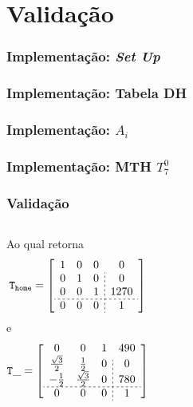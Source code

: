 \documentclass[aspectratio=169]{beamer}
\begin{document}



\section{Validação}

\begin{frame}
\frametitle{Implementação: \textit{Set Up}}

\end{frame}
\begin{frame}
\frametitle{Implementação: Tabela DH}

\end{frame}
\begin{frame}
\frametitle{Implementação: $A_i$}

\end{frame}
\begin{frame}
\frametitle{Implementação: MTH $T_7^0$}

\end{frame}
\begin{frame}
\frametitle{Validação}
\begin{columns}

Ao qual retorna
\begin{align*}
    \mathtt{T}_\mathtt{home}
    &=
    \left[
    \begin{array}{ccc;{2pt/2pt}c}
        1 & 0 & 0 & 0 \\
        0 & 1 & 0 & 0 \\
        0 & 0 & 1 & 1270 \\
        \hdashline[2pt/2pt]
        0 & 0 & 0 & 1
    \end{array}
    \right]
\end{align*}
e
\begin{align*}
    \mathtt{T\_} 
    &=
    \left[
    \begin{array}{ccc;{2pt/2pt}c}
        0 & 0 & 1 & 490 \\
        \frac{\sqrt{3}}{2} & \frac{1}{2} & 0 & 0 \\  -\frac{1}{2} & \frac{\sqrt{3}}{2} & 0 & 780 \\
        \hdashline[2pt/2pt]
        0 & 0 & 0 & 1
    \end{array}
    \right]
\end{align*}
\end{columns}
\end{frame}
\end{document}
